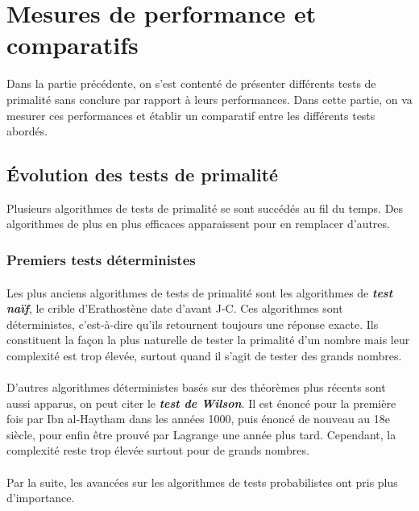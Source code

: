 \section{Mesures de performance et comparatifs}
	Dans la partie précédente, on s'est contenté de présenter différents tests de primalité sans conclure par rapport à leurs performances. Dans cette partie, on va mesurer ces performances et établir un comparatif entre les différents tests abordés.
	
	\subsection{Évolution des tests de primalité}
		Plusieurs algorithmes de tests de primalité se sont succédés au fil du temps. Des algorithmes de plus en plus efficaces apparaissent pour en remplacer d'autres.
	
		\subsubsection*{Premiers tests déterministes}
			\paragraph{}Les plus anciens algorithmes de tests de primalité sont les algorithmes de \textit{\textbf{test naïf}}, le crible d'Erathostène date d'avant J-C. Ces algorithmes sont déterministes, c'est-à-dire qu'ils retournent toujours une réponse exacte. Ils constituent la façon la plus naturelle de tester la primalité d'un nombre mais leur complexité est trop élevée, surtout quand il s'agit de tester des grands nombres.
			
			\paragraph{}D'autres algorithmes déterministes basés sur des théorèmes plus récents sont aussi apparus, on peut citer le \textit{\textbf{test de Wilson}}. Il est énoncé pour la première fois par Ibn al-Haytham dans les années 1000, puis énoncé de nouveau au 18e siècle, pour enfin être prouvé par Lagrange une année plus tard. Cependant, la complexité reste trop élevée surtout pour de grands nombres.
			
			\paragraph{}Par la suite, les avancées sur les algorithmes de tests probabilistes ont pris plus d'importance.
		
